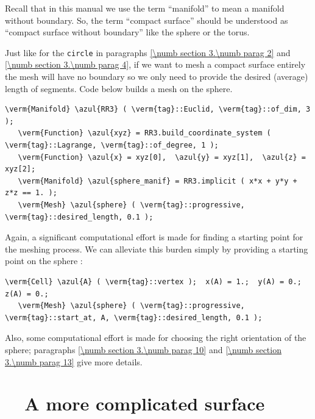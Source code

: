Recall that in this manual we use the term ``manifold'' to mean a manifold without boundary.
So, the term ``compact surface'' should be understood as ``compact surface without boundary''
like the sphere or the torus.

Just like for the {\small\tt circle} in paragraphs \ref{\numb section 3.\numb parag 2} and
\ref{\numb section 3.\numb parag 4}, if we want to mesh a compact surface entirely
the mesh will have no boundary so we only need to provide the desired (average) length
of segments.
Code below builds a mesh on the sphere.

\begin{Verbatim}[commandchars=\\\{\},formatcom=\small\tt,frame=single,
   label=parag-\ref{\numb section 3.\numb parag 6}.cpp,rulecolor=\color{coment},
   baselinestretch=0.94,framesep=2mm                                            ]
   \verm{Manifold} \azul{RR3} ( \verm{tag}::Euclid, \verm{tag}::of_dim, 3 );
   \verm{Function} \azul{xyz} = RR3.build_coordinate_system ( \verm{tag}::Lagrange, \verm{tag}::of_degree, 1 );
   \verm{Function} \azul{x} = xyz[0],  \azul{y} = xyz[1],  \azul{z} = xyz[2];
   \verm{Manifold} \azul{sphere_manif} = RR3.implicit ( x*x + y*y + z*z == 1. );
   \verm{Mesh} \azul{sphere} ( \verm{tag}::progressive, \verm{tag}::desired_length, 0.1 );
\end{Verbatim}

Again, a significant computational effort is made for finding a starting point
for the meshing process.
We can alleviate this burden simply by providing a starting point on the sphere :

\begin{Verbatim}[commandchars=\\\{\},formatcom=\small\tt,
   baselinestretch=0.94,framesep=2mm                     ]
   \verm{Cell} \azul{A} ( \verm{tag}::vertex );  x(A) = 1.;  y(A) = 0.;  z(A) = 0.;
   \verm{Mesh} \azul{sphere} ( \verm{tag}::progressive, \verm{tag}::start_at, A, \verm{tag}::desired_length, 0.1 );
\end{Verbatim}

Also, some computational effort is made for choosing the right orientation of the sphere;
paragraphs \ref{\numb section 3.\numb parag 10} and \ref{\numb section 3.\numb parag 13}
give more details.


\section{~~A more complicated surface}\label{\numb section 3.\numb parag 7}

